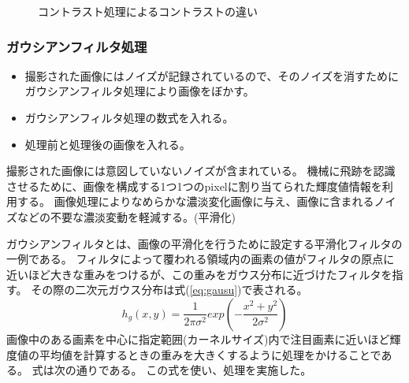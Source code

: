 \documentclass[12pt,a4paper]{jarticle}
\begin{document}
\begin{figure}[htbp]
\begin{center}
\begin{tabular}{c}
      \end{tabular}
      \caption{コントラスト処理によるコントラストの違い\label{fig:do_contrust_beforeandafter}}
    \end{center}
\end{figure}
\subsubsection{ガウシアンフィルタ処理}
\begin{itemize}
    \item 撮影された画像にはノイズが記録されているので、そのノイズを消すためにガウシアンフィルタ処理により画像をぼかす。
    \item ガウシアンフィルタ処理の数式を入れる。
    \item 処理前と処理後の画像を入れる。
\end{itemize}
撮影された画像には意図していないノイズが含まれている。
機械に飛跡を認識させるために、画像を構成する1つ1つのpixelに割り当てられた輝度値情報を利用する。
画像処理によりなめらかな濃淡変化画像に与え、画像に含まれるノイズなどの不要な濃淡変動を軽減する。(平滑化)
\par
ガウシアンフィルタとは、画像の平滑化を行うために設定する平滑化フィルタの一例である。
フィルタによって覆われる領域内の画素の値がフィルタの原点に近いほど大きな重みをつけるが、この重みをガウス分布に近づけたフィルタを指す。
その際の二次元ガウス分布は式(\ref{eq:gausu})で表される。
\begin{equation}
  h_g(x,y) = \frac{1}{2\pi\sigma^2}exp(-\frac{x^2 + y^2}{2\sigma^2})
\label{eq:gausu}
\end{equation}
画像中のある画素を中心に指定範囲(カーネルサイズ)内で注目画素に近いほど輝度値の平均値を計算するときの重みを大きくするように処理をかけることである。
式は次の通りである。
この式を使い、処理を実施した。
\end{document}
